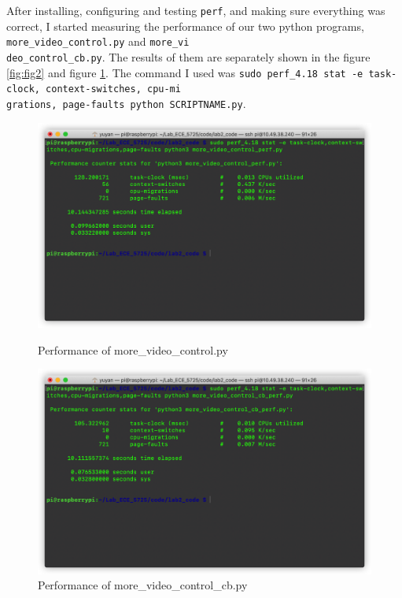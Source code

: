 \documentclass[12pt]{report}
\newcommand{\code}[1]{\colorbox{light-gray}{\texttt{#1}}}
\begin{document}
After installing, configuring and testing \code{perf}, and making sure everything was correct, I started measuring the performance of our two python programs,  \code{more\_video\_control.py} and \code{more\_vi}\\\code{deo\_control\_cb.py}. The results of them are separately shown in the figure \ref{fig:fig2} and figure \ref{fig:fig3}. The command I used was \code{sudo perf\_4.18 stat -e task-clock, context-switches, cpu-mi}\\\code{grations, page-faults python SCRIPTNAME.py}. 
\begin{figure}[H]
\centering
\begin{minipage}[t]{0.48\textwidth}
\centering
\includegraphics[width=\textwidth]{img/more_video_control_perf.png}
\caption{Performance of more\_video\_control.py}
\label{fig:fig2}
\end{minipage}
\begin{minipage}[t]{0.48\textwidth}
\centering
\includegraphics[width=\textwidth]{img/more_video_control_cb_perf.png}
\caption{Performance of more\_video\_control\_cb.py}
\label{fig:fig3}
\end{minipage}
\end{figure}
\end{document}
